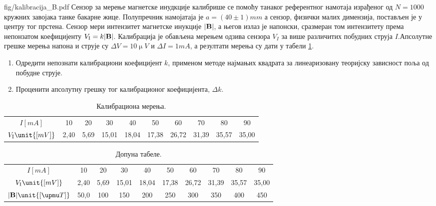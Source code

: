 \begin{slikaDesno}{fig/kalibracija_B.pdf}
\PID
Сензор за мерење магнетске инудкције калибрише се помоћу танаког референтног намотаја израђеног од $N = 1000$ 
кружних завојака танке бакарне жице. Полупречник намојатаја је $a = (40\pm 1)\unit{mm}$ а сензор, физички малих димензија, постављен 
је у центру тог прстена. Сензор мери интензитет магнетске инукције $|\bf{B}|$, а његов излаз је напонски, сразмеран том интензитету
према непонзатом коефицијенту $V_{\rm I} = k |\bf{B}|$. Калибрација је обављена мерењем одзива сензора $V_I$ за више различитих 
побудних струја $I$.Апсолутне грешке мерења напона и струје су $\Delta V = 10\unit{\upmu V}$ и $\Delta I = 1\unit{mA}$, а 
резултати мерења су дати у табели \ref{tab:\ID}.
\end{slikaDesno}
\begin{enumerate}[label=(\alph*)]
    \item Одредити непознати калибрациони коефицијент $k$, применом методе најмањих квадрата за линеаризовану теоријску зависност 
    поља од побудне струје.
    \item Проценити апсолутну грешку тог калибрационог коефицијента, $\Delta k$.
\end{enumerate}
\begin{table}[ht!]
    \centering
    \begin{tabular}{c||ccccccccc} 
        \hline
        $I\unit{[mA]}$ & 10 & 20 & 30 & 40 & 50 & 60 & 70 & 80 & 90 \\
        $V_{\rm I}\unit{[mV]}$ & 2,40 & 5,69 & 15,01 & 18,04 & 17,38 & 26,72 & 31,39 & 35,57 & 35,00 \\
        \hline
    \end{tabular}
    \caption{Калибрациона мерења.}
    \label{tab:\ID}
\end{table}

\RESENJE

\begin{table}[b!]
    \centering
    \begin{tabular}{c||ccccccccc} 
        \hline
        $I\unit{[mA]}$ & 10 & 20 & 30 & 40 & 50 & 60 & 70 & 80 & 90 \\
        $V_{\rm I}\unit{[mV]}$ & 2,40 & 5,69 & 15,01 & 18,04 & 17,38 & 26,72 & 31,39 & 35,57 & 35,00 \\ 
        $|{\bf B}|\unit{[\upmu T]}$ & 50,0 & 100 & 150 & 200 & 250 & 300 & 350 & 400 & 450   \\ 
        \hline
    \end{tabular}
    \caption{Допуна табеле.}
    \label{tab:\ID:dopuna}
\end{table}

